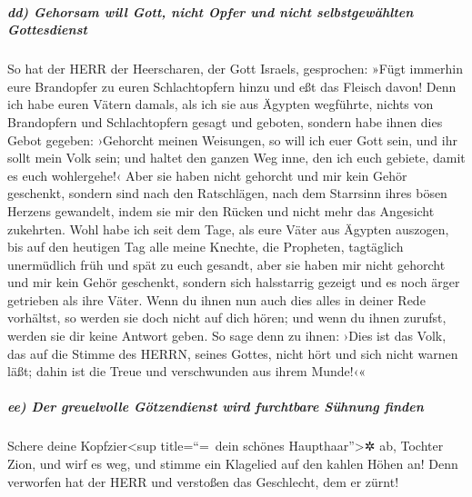 \hypertarget{dd-gehorsam-will-gott-nicht-opfer-und-nicht-selbstgewuxe4hlten-gottesdienst}{%
\subparagraph{dd) Gehorsam will Gott, nicht Opfer und nicht
selbstgewählten
Gottesdienst}\label{dd-gehorsam-will-gott-nicht-opfer-und-nicht-selbstgewuxe4hlten-gottesdienst}}

So hat der HERR der Heerscharen, der Gott Israels,
gesprochen: »Fügt immerhin eure Brandopfer zu euren Schlachtopfern hinzu
und eßt das Fleisch davon! Denn ich habe euren Vätern
damals, als ich sie aus Ägypten wegführte, nichts von Brandopfern und
Schlachtopfern gesagt und geboten, sondern habe ihnen
dies Gebot gegeben: ›Gehorcht meinen Weisungen, so will ich euer Gott
sein, und ihr sollt mein Volk sein; und haltet den ganzen Weg inne, den
ich euch gebiete, damit es euch wohlergehe!‹ Aber sie
haben nicht gehorcht und mir kein Gehör geschenkt, sondern sind nach den
Ratschlägen, nach dem Starrsinn ihres bösen Herzens gewandelt, indem sie
mir den Rücken und nicht mehr das Angesicht zukehrten.
Wohl habe ich seit dem Tage, als eure Väter aus Ägypten
auszogen, bis auf den heutigen Tag alle meine Knechte, die Propheten,
tagtäglich unermüdlich früh und spät zu euch gesandt,
aber sie haben mir nicht gehorcht und mir kein Gehör
geschenkt, sondern sich halsstarrig gezeigt und es noch ärger getrieben
als ihre Väter. Wenn du ihnen nun auch dies alles in
deiner Rede vorhältst, so werden sie doch nicht auf dich hören; und wenn
du ihnen zurufst, werden sie dir keine Antwort geben. So
sage denn zu ihnen: ›Dies ist das Volk, das auf die Stimme des HERRN,
seines Gottes, nicht hört und sich nicht warnen läßt; dahin ist die
Treue und verschwunden aus ihrem Munde!‹«

\hypertarget{ee-der-greuelvolle-guxf6tzendienst-wird-furchtbare-suxfchnung-finden}{%
\subparagraph{ee) Der greuelvolle Götzendienst wird furchtbare Sühnung
finden}\label{ee-der-greuelvolle-guxf6tzendienst-wird-furchtbare-suxfchnung-finden}}

Schere deine Kopfzier\textless sup title=``=~dein schönes
Haupthaar''\textgreater✲ ab, Tochter Zion, und wirf es weg, und stimme
ein Klagelied auf den kahlen Höhen an! Denn verworfen hat der HERR und
verstoßen das Geschlecht, dem er zürnt!

